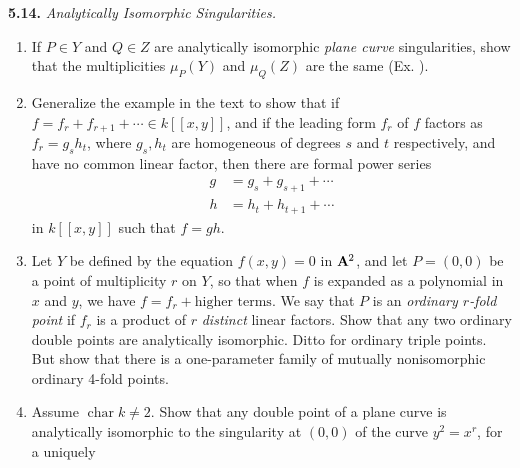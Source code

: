 {\smallskip
\noindent\hypertarget{ex-I-5.14}{}\textbf{5.14.} \emph{Analytically Isomorphic Singularities.}
\begin{enumerate}[label=(\alph*),leftmargin=2.4em,nosep]
\item If $P\in Y$ and $Q\in Z$ are analytically isomorphic \emph{plane curve} singularities, show that the multiplicities $\mu_P(Y)$ and $\mu_Q(Z)$ are the same (Ex. ).
\item Generalize the example in the text  to show that if $f=f_r+f_{r+1}+\cdots\in k[[x,y]]$, and if the leading form $f_r$ of $f$ factors as $f_r=g_s h_t$, where $g_s,h_t$ are homogeneous of degrees $s$ and $t$ respectively, and have no common linear factor, then there are formal power series
\[
\begin{aligned}
g&=g_s+g_{s+1}+\cdots\\
h&=h_t+h_{t+1}+\cdots
\end{aligned}
\]
in $k[[x,y]]$ such that $f=gh$.
\item Let $Y$ be defined by the equation $f(x,y)=0$ in $\AffSpace{2}$, and let $P=(0,0)$ be a point of multiplicity $r$ on $Y$, so that when $f$ is expanded as a polynomial in $x$ and $y$, we have $f=f_r+\text{higher terms}$. We say that $P$ is an \emph{ordinary $r$-fold point} if $f_r$ is a product of $r$ \emph{distinct} linear factors. Show that any two ordinary double points are analytically isomorphic. Ditto for ordinary triple points. But show that there is a one-parameter family of mutually nonisomorphic ordinary 4-fold points.
\item[*(d)] Assume $\operatorname{char}k\ne2$. Show that any double point of a plane curve is analytically isomorphic to the singularity at $(0,0)$ of the curve $y^2=x^r$, for a uniquely
\end{enumerate}}
